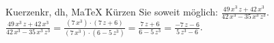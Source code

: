 \begin{MAufgabe}{Kuerzen}{kr, dh, MaTeX}
K\"urzen Sie soweit m\"oglich: $\frac{49\, x^3\, z + 42\, x^3}{42\, x^3 - 35\, x^3\, z^3}$.\\ 
\ifLsg\MLoesung
\quad $\frac{49\, x^3\, z + 42\, x^3}{42\, x^3 - 35\, x^3\, z^3}=\frac{(7\, x^3)\cdot(7\, z + 6)}{(7\, x^3)\cdot(6 - 5\, z^3)}=\frac{7\, z + 6}{6 - 5\, z^3}=\frac{ - 7\, z - 6}{5\, z^3 - 6}$.\else\relax\fi
 \end{MAufgabe}